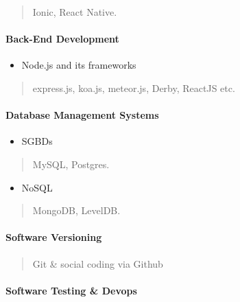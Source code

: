 \documentclass[]{article}
\providecommand{\tightlist}{%
  \setlength{\itemsep}{0pt}\setlength{\parskip}{0pt}}
\let\oldparagraph\paragraph
\renewcommand{\paragraph}[1]{\oldparagraph{#1}\mbox{}}
\begin{document}
\begin{quote}
Ionic, React Native.
\end{quote}

\paragraph{Back-End Development}\label{back-end-development}

\begin{itemize}
\tightlist
\item
  Node.js and its frameworks
\end{itemize}

\begin{quote}
express.js, koa.js, meteor.js, Derby, ReactJS etc.
\end{quote}

\paragraph{Database Management
Systems}\label{database-management-systems}

\begin{itemize}
\tightlist
\item
  SGBDs
\end{itemize}

\begin{quote}
MySQL, Postgres.
\end{quote}

\begin{itemize}
\tightlist
\item
  NoSQL
\end{itemize}

\begin{quote}
MongoDB, LevelDB.
\end{quote}

\paragraph{Software Versioning}\label{software-versioning}

\begin{quote}
Git \& social coding via Github
\end{quote}

\paragraph{Software Testing \& Devops}\label{software-testing-devops}
\end{document}
